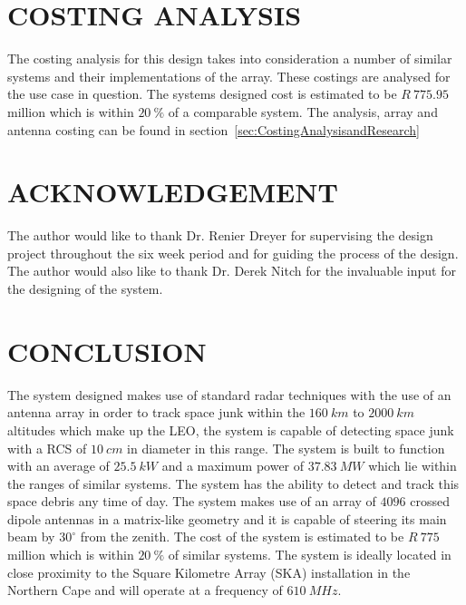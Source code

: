 \documentclass[11pt]{witseiepaper}
\begin{document}
\begin{bibunit}[witseie]

\section{COSTING ANALYSIS} \label{sec:CostingAnalysis}
The costing analysis for this design takes into consideration a number of similar systems and their implementations of the array. These costings are analysed for the use case in question.
The systems designed cost is estimated to be $R~775.95$ million which is within $20~\%$ of a comparable system.
The analysis, array and antenna costing can be found in section~\ref{sec:CostingAnalysisandResearch}


\section*{ACKNOWLEDGEMENT} \label{sec:ACKNOWLEDGEMENT}
The author would like to thank Dr. Renier Dreyer for supervising the design project throughout the six week period and for guiding the process of the design.
The author would also like to thank Dr. Derek Nitch for the invaluable input for the designing of the system.


\section{CONCLUSION} \label{sec:CONCLUSION}
The system designed makes use of standard radar techniques with the use of an antenna array in order to track space junk within the $160~km$ to $2000~km$ altitudes which make up the LEO, the system is capable of detecting space junk with a RCS of $10~cm$ in diameter in this range. The system is built to function with an average of $25.5~kW$ and a maximum power of $37.83~MW$ which lie within the ranges of similar systems. The system has the ability to detect and track this space debris any time of day. The system makes use of an array of $4096$ crossed dipole antennas in a matrix-like geometry and it is capable of steering its main beam by $30^{\circ}$ from the zenith.
The cost of the system is estimated to be $R~775$ million which is within $20~\%$ of similar systems. The system is ideally located in close proximity to the Square Kilometre Array (SKA) installation in the Northern Cape and will operate at a frequency of $610~MHz$.   
% 
% 

\putbib[references]
\end{bibunit}
\end{document}
